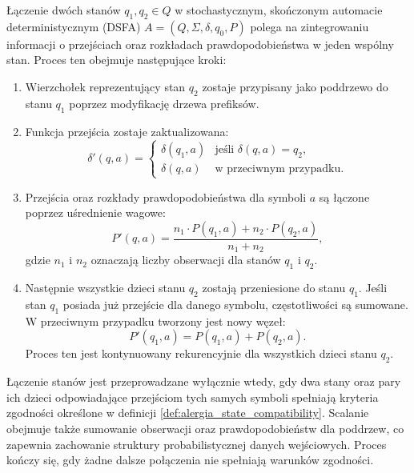 \begin{definition}  
\label{def:alergia_state_merging}  
Łączenie dwóch stanów \( q_1, q_2 \in Q \) w stochastycznym, skończonym automacie deterministycznym (DSFA) \( A = (Q, \Sigma, \delta, q_0, P) \) polega na zintegrowaniu informacji o przejściach oraz rozkładach prawdopodobieństwa w jeden wspólny stan. Proces ten obejmuje następujące kroki:  

\begin{enumerate}  
    \item Wierzchołek reprezentujący stan \( q_2 \) zostaje przypisany jako poddrzewo do stanu \( q_1 \) poprzez modyfikację drzewa prefiksów.  
    \item Funkcja przejścia zostaje zaktualizowana:  
    \[
    \delta'(q, a) =
    \begin{cases}  
        \delta(q_1, a) & \text{jeśli } \delta(q, a) = q_2, \\  
        \delta(q, a) & \text{w przeciwnym przypadku.}  
    \end{cases}  
    \]  
    \item Przejścia oraz rozkłady prawdopodobieństwa dla symboli \( a \) są łączone poprzez uśrednienie wagowe:  
    \[
    P'(q, a) = \frac{n_1 \cdot P(q_1, a) + n_2 \cdot P(q_2, a)}{n_1 + n_2},
    \]  
    gdzie \( n_1 \) i \( n_2 \) oznaczają liczby obserwacji dla stanów \( q_1 \) i \( q_2 \).  
    \item Następnie wszystkie dzieci stanu \( q_2 \) zostają przeniesione do stanu \( q_1 \). Jeśli stan \( q_1 \) posiada już przejście dla danego symbolu, częstotliwości są sumowane. W przeciwnym przypadku tworzony jest nowy węzeł:  
    \[
    P'(q_1, a) = P(q_1, a) + P(q_2, a).
    \]  
    Proces ten jest kontynuowany rekurencyjnie dla wszystkich dzieci stanu \( q_2 \).  
\end{enumerate}  
\end{definition}  

Łączenie stanów jest przeprowadzane wyłącznie wtedy, gdy dwa stany oraz pary ich dzieci odpowiadające przejściom tych samych symboli spełniają kryteria zgodności określone w definicji \ref{def:alergia_state_compatibility}. Scalanie obejmuje także sumowanie obserwacji oraz prawdopodobieństw dla poddrzew, co zapewnia zachowanie struktury probabilistycznej danych wejściowych. Proces kończy się, gdy żadne dalsze połączenia nie spełniają warunków zgodności.  

